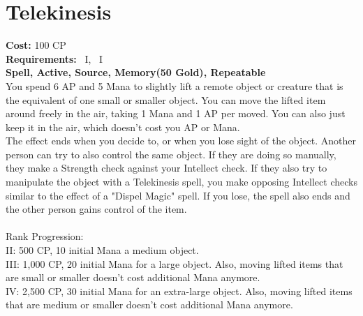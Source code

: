 \section{Telekinesis}\label{spell:telekinesis}
\textbf{Cost:} 100 CP\\
\textbf{Requirements:}~ I,~ I\\
\textbf{Spell, Active, Source, Memory(50 Gold), Repeatable}\\
You spend 6 AP and 5 Mana to slightly lift a remote object or creature that is the equivalent of one small or smaller object.
You can move the lifted item around freely in the air, taking 1 Mana and 1 AP per  moved.
You can also just keep it in the air, which doesn't cost you AP or Mana.\\
The effect ends when you decide to, or when you lose sight of the object.
Another person can try to also control the same object.
If they are doing so manually, they make a Strength check against your Intellect check.
If they also try to manipulate the object with a Telekinesis spell, you make opposing Intellect checks similar to the effect of a "Dispel Magic" spell.
If you lose, the spell also ends and the other person gains control of the item.\\
\\
Rank Progression:\\
II: 500 CP, 10 initial Mana a medium object.\\

III: 1,000 CP, 20 initial Mana for a large object.
Also, moving lifted items that are small or smaller doesn't cost additional Mana anymore.\\

IV: 2,500 CP, 30 initial Mana for an extra-large object.
Also, moving lifted items that are medium or smaller doesn't cost additional Mana anymore.